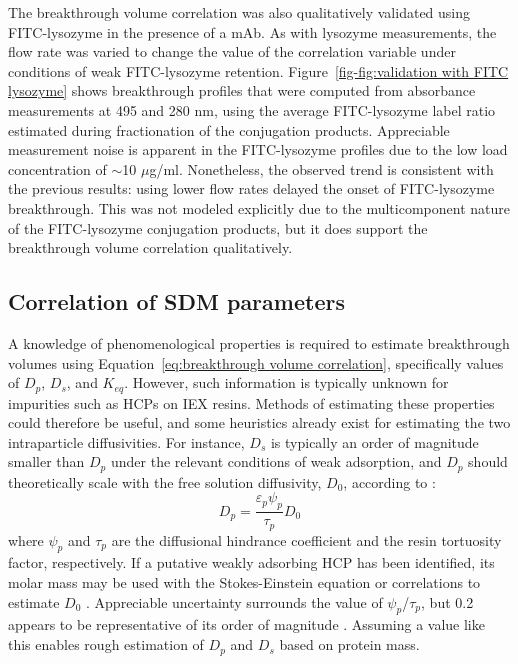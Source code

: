 \documentclass[preprint,review,12pt]{elsarticle}
\begin{document}
        The breakthrough volume correlation was also qualitatively validated using FITC-lysozyme in the presence of a mAb. As with lysozyme measurements, the flow rate was varied to change the value of the correlation variable under conditions of weak FITC-lysozyme retention. Figure~\ref{fig-fig:validation with FITC lysozyme} shows breakthrough profiles that were computed from absorbance measurements at 495 and 280 nm, using the average FITC-lysozyme label ratio estimated during fractionation of the conjugation products. Appreciable measurement noise is apparent in the FITC-lysozyme profiles due to the low load concentration of $\sim$10 $\mu$g/ml. Nonetheless, the observed trend is consistent with the previous results:  using lower flow rates delayed the onset of FITC-lysozyme breakthrough. This was not modeled explicitly due to the multicomponent nature of the FITC-lysozyme conjugation products, but it does support the breakthrough volume correlation qualitatively.



    \subsection{Correlation of SDM parameters} \label{ssec:thermo corr}

        A knowledge of phenomenological properties is required to estimate breakthrough volumes using Equation~\ref{eq:breakthrough volume correlation}, specifically values of $D_p$, $D_s$, and $K_{eq}$. However, such information is typically unknown for impurities such as HCPs on IEX resins. Methods of estimating these properties could therefore be useful, and some heuristics already exist for estimating the two intraparticle diffusivities. For instance, $D_s$ is typically an order of magnitude smaller than $D_p$ under the relevant conditions of weak adsorption, and $D_p$ should theoretically scale with the free solution diffusivity, $D_0$, according to \cite{Carta2010a}:
        \begin{equation} \label{eq:tortuosity relationship}
            D_p = \frac{\varepsilon_p \psi_p}{\tau_p} D_0
        \end{equation}
        where $\psi_p$ and $\tau_p$ are the diffusional hindrance coefficient and the resin tortuosity factor, respectively. If a putative weakly adsorbing HCP has been identified, its molar mass may be used with the Stokes-Einstein equation or correlations to estimate $D_0$ \cite{Young1980}. Appreciable uncertainty surrounds the value of $\psi_p$/$\tau_p$, but 0.2 appears to be representative of its order of magnitude \cite{Angelo2016b}. Assuming a value like this enables rough estimation of $D_p$ and $D_s$ based on protein mass.
\end{document}
